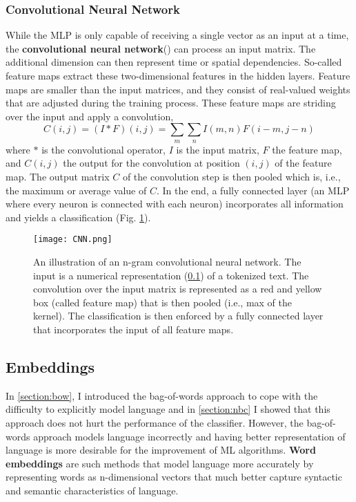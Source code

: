 \subsubsection{Convolutional Neural Network}
  While the MLP is only capable of receiving a single vector as an input at a time, the \textbf{convolutional neural network}() can process an input matrix.
  The additional dimension can then represent time or spatial dependencies.
  So-called feature maps extract these two-dimensional features in the hidden layers.
  Feature maps are smaller than the input matrices, and they consist of real-valued weights that are adjusted during the training process.
  These feature maps are striding over the input and apply a convolution,
  \[C(i,j) = (I \ast F)(i,j) = \sum_m \sum_n I(m, n) F(i-m, j-n)\] where $\ast$ is the convolutional operator, $I$ is the input matrix, $F$ the feature map, and $C(i,j)$ the output for the convolution at position $(i,j)$ of the feature map.
  The output matrix $C$ of the convolution step is then pooled which is, i.e., the maximum or average value of $C$.
  In the end, a fully connected layer (an MLP where every neuron is connected with each neuron) incorporates all information and yields a classification (Fig. \ref{fig:cnn}).
  \begin{figure}[h!]
      \centering
      \texttt{[image: CNN.png]}
      \caption{An illustration of an n-gram convolutional neural network. The input is a numerical representation (\ref{section:embeddings}) of a tokenized text. The convolution over the input matrix is represented as a red and yellow box (called feature map) that is then pooled (i.e., max of the kernel). The classification is then enforced by a fully connected layer that incorporates the input of all feature maps.}
      \label{fig:cnn}
  \end{figure}

\subsection{Embeddings}\label{section:embeddings}
  In \ref{section:bow}, I introduced the bag-of-words approach to cope with the difficulty to explicitly model language and in \ref{section:nbc} I showed that this approach does not hurt the performance of the classifier.
  However, the bag-of-words approach models language incorrectly and having better representation of language is more desirable for the improvement of ML algorithms.
  \textbf{Word embeddings} are such methods that model language more accurately by representing words as n-dimensional vectors that much better capture syntactic and semantic characteristics of language.

